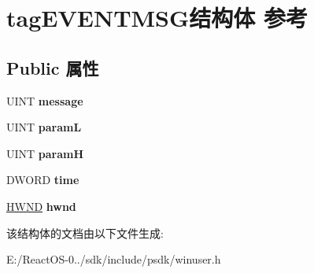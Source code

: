 \hypertarget{structtag_e_v_e_n_t_m_s_g}{}\section{tag\+E\+V\+E\+N\+T\+M\+S\+G结构体 参考}
\label{structtag_e_v_e_n_t_m_s_g}
\subsection*{Public 属性}
\begin{DoxyCompactItemize}
\item 
\mbox{\label{structtag_e_v_e_n_t_m_s_g_a3d551c4468fd6b2936d3ff07b41da8ae}} 
U\+I\+NT {\bfseries message}
\item 
\mbox{\label{structtag_e_v_e_n_t_m_s_g_a2d42b3f46fa1ddf652bda218ad0eccf5}} 
U\+I\+NT {\bfseries paramL}
\item 
\mbox{\label{structtag_e_v_e_n_t_m_s_g_a2032b304f82ddd41f1f401e05642fe5e}} 
U\+I\+NT {\bfseries paramH}
\item 
\mbox{\label{structtag_e_v_e_n_t_m_s_g_a538a7699f51029722562ddf752f28003}} 
D\+W\+O\+RD {\bfseries time}
\item 
\mbox{\label{structtag_e_v_e_n_t_m_s_g_ade54ad593a6912e7150b13d9370cdcca}} 
\hyperlink{interfacevoid}{H\+W\+ND} {\bfseries hwnd}
\end{DoxyCompactItemize}


该结构体的文档由以下文件生成\+:\begin{DoxyCompactItemize}
\item 
E\+:/\+React\+O\+S-\/0../sdk/include/psdk/winuser.\+h\end{DoxyCompactItemize}
